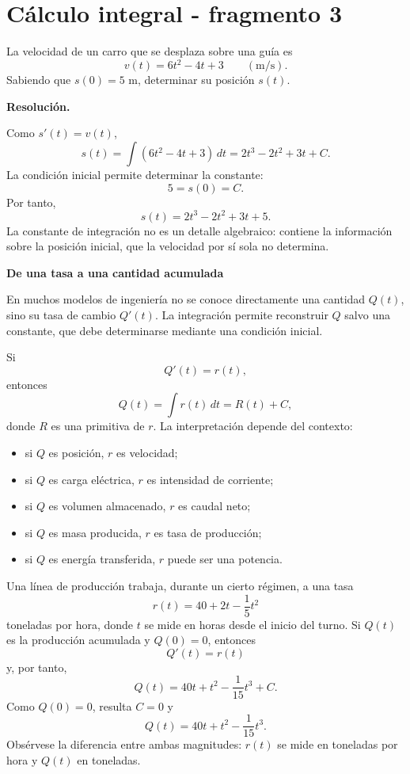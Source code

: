 \section{Cálculo integral - fragmento 3}
\begin{solvedexercise}
La velocidad de un carro que se desplaza sobre una guía es
\[
v(t)=6t^2-4t+3\qquad (\mathrm{m/s}).
\]
Sabiendo que $s(0)=5$ m, determinar su posición $s(t)$.

\textbf{Resolución.}\par\smallskip
Como $s'(t)=v(t)$,
\[
s(t)=\int(6t^2-4t+3)\,dt
=2t^3-2t^2+3t+C.
\]
La condición inicial permite determinar la constante:
\[
5=s(0)=C.
\]
Por tanto,
\[
\boxed{s(t)=2t^3-2t^2+3t+5.}
\]
La constante de integración no es un detalle algebraico: contiene la información sobre la posición inicial, que la velocidad por sí sola no determina.
\end{solvedexercise}

\textbf{De una tasa a una cantidad acumulada}

En muchos modelos de ingeniería no se conoce directamente una cantidad $Q(t)$, sino su tasa de cambio $Q'(t)$. La integración permite reconstruir $Q$ salvo una constante, que debe determinarse mediante una condición inicial.

Si
\[
Q'(t)=r(t),
\]
entonces
\[
Q(t)=\int r(t)\,dt=R(t)+C,
\]
donde $R$ es una primitiva de $r$. La interpretación depende del contexto:

\begin{itemize}
\item si $Q$ es posición, $r$ es velocidad;
\item si $Q$ es carga eléctrica, $r$ es intensidad de corriente;
\item si $Q$ es volumen almacenado, $r$ es caudal neto;
\item si $Q$ es masa producida, $r$ es tasa de producción;
\item si $Q$ es energía transferida, $r$ puede ser una potencia.
\end{itemize}

\begin{example}
Una línea de producción trabaja, durante un cierto régimen, a una tasa
\[
r(t)=40+2t-\frac15t^2
\]
toneladas por hora, donde $t$ se mide en horas desde el inicio del turno. Si $Q(t)$ es la producción acumulada y $Q(0)=0$, entonces
\[
Q'(t)=r(t)
\]
y, por tanto,
\[
Q(t)=40t+t^2-\frac1{15}t^3+C.
\]
Como $Q(0)=0$, resulta $C=0$ y
\[
\boxed{Q(t)=40t+t^2-\frac1{15}t^3.}
\]
Obsérvese la diferencia entre ambas magnitudes: $r(t)$ se mide en toneladas por hora y $Q(t)$ en toneladas.
\end{example}


